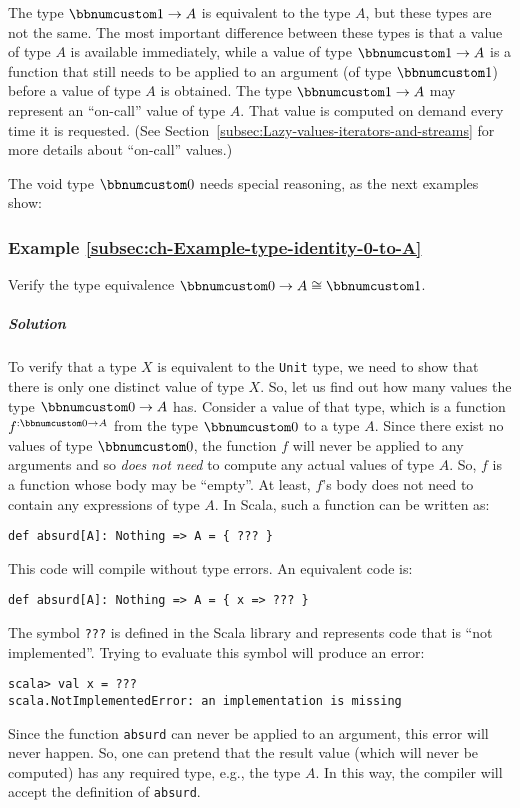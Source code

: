 The type $\bbnum 1\rightarrow A$ is equivalent to the type $A$,
but these types are not the same. The most important difference between
these types is that a value of type $A$ is available immediately,
while a value of type $\bbnum 1\rightarrow A$ is a function that
still needs to be applied to an argument (of type $\bbnum 1$) before
a value of type $A$ is obtained. The type $\bbnum 1\rightarrow A$
may represent an \textsf{``}on-call\textsf{''} value of type
$A$. That value is computed on demand every time it is requested.
(See Section~\ref{subsec:Lazy-values-iterators-and-streams} for
more details about \textsf{``}on-call\textsf{''} values.)

The void type $\bbnum 0$ needs special reasoning,
as the next examples show:

\subsubsection{Example \label{subsec:ch-Example-type-identity-0-to-A}\ref{subsec:ch-Example-type-identity-0-to-A}}

Verify the type equivalence $\bbnum 0\rightarrow A\cong\bbnum 1$.

\subparagraph{Solution}

To verify that a type $X$ is equivalent to the \lstinline!Unit!
type, we need to show that there is only one distinct value of type
$X$. So, let us find out how many values the type $\bbnum 0\rightarrow A$
has. Consider a value of that type, which is a function $f^{:\bbnum 0\rightarrow A}$
from the type $\bbnum 0$ to a type $A$. Since there exist no values
of type $\bbnum 0$, the function $f$ will never be applied to any
arguments and so \emph{does not need} to compute any actual values
of type $A$. So, $f$ is a function whose body may be \textsf{``}empty\textsf{''}.
At least, $f$\textsf{'}s body does not need to contain any expressions of
type $A$. In Scala, such a function can be written as:
\begin{lstlisting}
def absurd[A]: Nothing => A = { ??? }
\end{lstlisting}
This code will compile without type errors. An equivalent code is:
\begin{lstlisting}
def absurd[A]: Nothing => A = { x => ??? }
\end{lstlisting}
The symbol \lstinline!???! is defined in the Scala library and represents
code that is \textsf{``}not implemented\textsf{''}. Trying to evaluate this symbol
will produce an error:
\begin{lstlisting}
scala> val x = ???
scala.NotImplementedError: an implementation is missing
\end{lstlisting}
Since the function \lstinline!absurd! can never be applied to an
argument, this error will never happen. So, one can pretend that the
result value (which will never be computed) has any required type,
e.g., the type $A$. In this way, the compiler will accept the definition
of \lstinline!absurd!.

